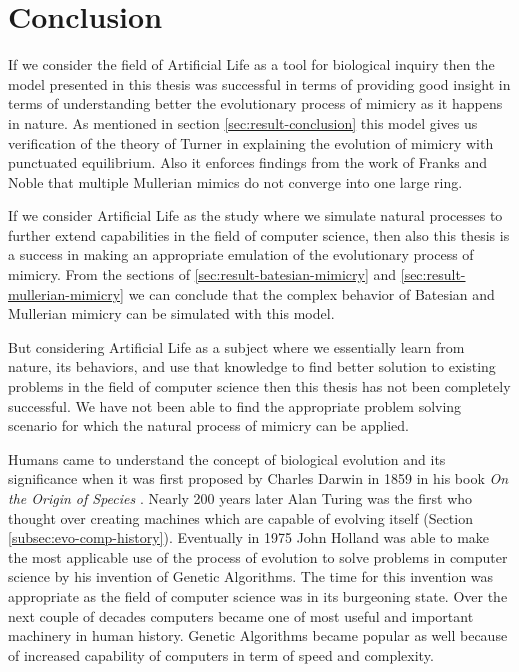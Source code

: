 \documentclass[letterpaper]{article}
\numberwithin{equation}{section}
\begin{document}
\section{Conclusion}
\label{section:conclusion}
If we consider the field of Artificial Life as a tool for biological inquiry then the model presented in this thesis was successful in terms of providing good insight in terms of understanding better the evolutionary process of mimicry as it happens in nature. As mentioned in section \ref{sec:result-conclusion} this model gives us verification of the theory of Turner in explaining the evolution of mimicry with punctuated equilibrium. Also it enforces findings from the work of Franks and Noble that multiple Mullerian mimics do not converge into one large ring.

If we consider Artificial Life as the study where we simulate natural processes to further extend capabilities in the field of computer science, then also this thesis is a success in making an appropriate emulation of the evolutionary process of mimicry. From the sections of \ref{sec:result-batesian-mimicry} and \ref{sec:result-mullerian-mimicry} we can conclude that the complex behavior of Batesian and Mullerian mimicry can be simulated with this model.

But considering Artificial Life as a subject where we essentially learn from nature, its behaviors, and use that knowledge to find better solution to existing problems in the field of computer science then this thesis has not been completely successful. We have not been able to find the appropriate problem solving scenario for which the natural process of mimicry can be applied.

Humans came to understand the concept of biological evolution and its significance when it was first proposed by Charles Darwin in 1859 in his book \textsl{On the Origin of Species} \cite{darwin1859}. Nearly 200 years later Alan Turing was the first who thought over creating machines which are capable of evolving itself (Section \ref{subsec:evo-comp-history}). Eventually in 1975 John Holland was able to make the most applicable use of the process of evolution to solve problems in computer science by his invention of Genetic Algorithms. The time for this invention was appropriate as the field of computer science was in its burgeoning state. Over the next couple of decades computers became one of most useful and important machinery in human history. Genetic Algorithms became popular as well because of increased capability of computers in term of speed and complexity.  
\end{document}

